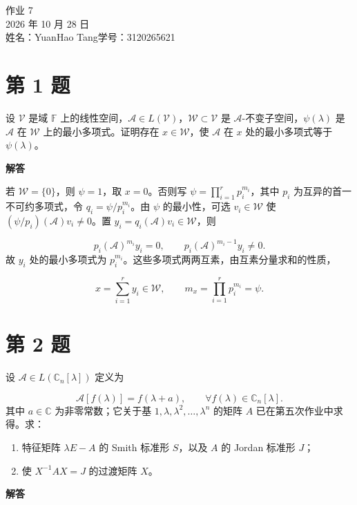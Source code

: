 \documentclass[UTF8,10pt,letterpaper,fontset=fandol]{ctexart}
\newcommand{\C}{\mathbb C}
\newcommand{\F}{\mathbb F}
\begin{document}
\begin{center}
{\LARGE 作业 7}\\[0.6em]
2026 年 10 月 28 日\\[0.25em]
姓名：YuanHao Tang\quad 学号：3120265621
\end{center}

\section{第 1 题}
设 $\mathcal V$ 是域 $\F$ 上的线性空间，$\mathcal A\in L(\mathcal V)$，$\mathcal W\subset\mathcal V$ 是 $\mathcal A$-不变子空间，$\psi(\lambda)$ 是 $\mathcal A$ 在 $\mathcal W$ 上的最小多项式。证明存在 $x\in\mathcal W$，使 $\mathcal A$ 在 $x$ 处的最小多项式等于 $\psi(\lambda)$。

\par{}\textbf{解答}\par
若 $\mathcal W=\{0\}$，则 $\psi=1$，取 $x=0$。否则写 $\psi=\prod_{i=1}^r p_i^{m_i}$，其中 $p_i$ 为互异的首一不可约多项式，令 $q_i=\psi/p_i^{m_i}$。由 $\psi$ 的最小性，可选 $v_i\in\mathcal W$ 使 $(\psi/p_i)(\mathcal A)v_i\ne0$。置 $y_i=q_i(\mathcal A)v_i\in\mathcal W$，则

\[
p_i(\mathcal A)^{m_i}y_i=0,\qquad p_i(\mathcal A)^{m_i-1}y_i\ne0.
\]
故 $y_i$ 处的最小多项式为 $p_i^{m_i}$。这些多项式两两互素，由互素分量求和的性质，

\[
\boxed{x=\sum_{i=1}^r y_i\in\mathcal W,\qquad m_x=\prod_{i=1}^r p_i^{m_i}=\psi}.
\]

\section{第 2 题}
设 $\mathcal A\in L(\C_n[\lambda])$ 定义为

\[
\mathcal A[f(\lambda)]=f(\lambda+a),\qquad\forall f(\lambda)\in\C_n[\lambda].
\]
其中 $a\in\C$ 为非零常数；它关于基 $1,\lambda,\lambda^2,\ldots,\lambda^n$ 的矩阵 $A$ 已在第五次作业中求得。求：

\begin{enumerate}
\item 特征矩阵 $\lambda E-A$ 的 Smith 标准形 $S$，以及 $A$ 的 Jordan 标准形 $J$；

\item 使 $X^{-1}AX=J$ 的过渡矩阵 $X$。

\end{enumerate}

\par{}\textbf{解答}\par
\end{document}

